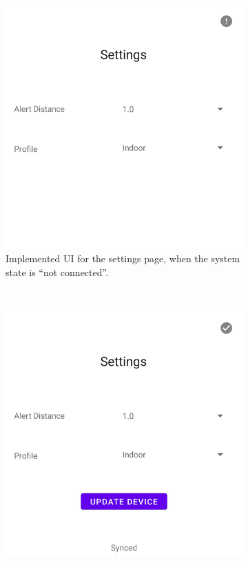 \documentclass{l4proj}
\begin{document}
\begin{figure}[!htb]
    \centering
    \begin{subfigure}[b]{0.47\textwidth}
        \includegraphics[width=\textwidth]{images/settings_not_connected.png}
        \caption{ Implemented UI for the settings page, when the system state is “not connected”. }
        \label{fig:settings_not_connected}
    \end{subfigure}
    ~
    \begin{subfigure}[b]{0.47\textwidth}
        \includegraphics[width=\textwidth]{images/settings_connection.png}

\end{subfigure}
\end{figure}
\end{document}
